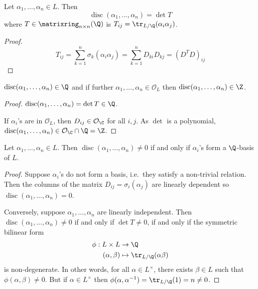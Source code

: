 \documentclass[a4paper]{article}
\renewcommand*{\O}{\mathcal{O}}
\DeclareMathOperator{\disc}{disc}
\begin{document}
\begin{lemma}
  Let \(\alpha_1, \dots, \alpha_n \in L\). Then
  \[
    \disc(\alpha_1, \dots, \alpha_n) = \det T
  \]
  where \(T \in \matrixring_{n \times n}(\Q)\) is \(T_{ij} = \tr_{L/\Q}(\alpha_i\alpha_j)\).
\end{lemma}

\begin{proof}
  \[
    T_{ij}
    = \sum_{k = 1}^n \sigma_k(\alpha_i\alpha_j)
    = \sum_{k = 1}^n D_{ki}D_{kj}
    = (D^TD)_{ij}
  \]
\end{proof}

\begin{corollary}
  \(\disc(\alpha_1, \dots, \alpha_n) \in \Q\) and if further \(\alpha_1, \dots, \alpha_n \in \O_L\) then \(\disc(\alpha_1, \dots, \alpha_n) \in \Z\).
\end{corollary}

\begin{proof}
  \(\disc(\alpha_1, \dots, \alpha_n) = \det T \in \Q\).

  If \(\alpha_i\)'s are in \(\O_L\), then \(D_{ij} \in \O_\C\) for all \(i, j\). As \(\det\) is a polynomial, \(\disc(\alpha_1, \dots, \alpha_n) \in \O_\C \cap \Q = \Z\).
\end{proof}

\begin{proposition}
  Let \(\alpha_1, \dots, \alpha_n \in L\). Then \(\disc(\alpha_1, \dots, \alpha_n) \neq 0\) if and only if \(\alpha_i\)'s form a \(\Q\)-basis of \(L\).
\end{proposition}

\begin{proof}
  Suppose \(\alpha_i\)'s do not form a basis, i.e.\ they satisfy a non-trivial relation. Then the columns of the matrix \(D_{ij} = \sigma_i(\alpha_j)\) are linearly dependent so \(\disc(\alpha_1, \dots, \alpha_n) = 0\).

  Conversely, suppose \(\alpha_1, \dots, \alpha_n\) are linearly independent. Then \(\disc(\alpha_1, \dots, \alpha_n) \neq 0\) if and only if \(\det T \neq 0\), if and only if the symmetric bilinear form
  \begin{align*}
    \phi: L \times L &\to \Q \\
    (\alpha, \beta) &\mapsto \tr_{L/\Q}(\alpha\beta)
  \end{align*}
  is non-degenerate. In other words, for all \(\alpha \in L^\times\), there exists \(\beta \in L\) such that \(\phi(\alpha, \beta) \neq 0\). But if \(\alpha \in L^\times\) then \(\phi(\alpha, \alpha^{-1}) = \tr_{L/\Q}(1) = n \neq 0\).
\end{proof}
\end{document}
